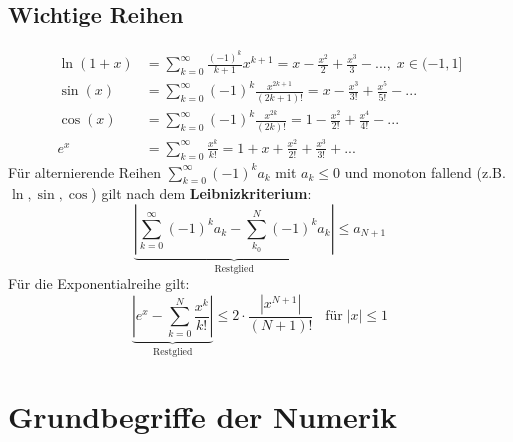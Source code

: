 \documentclass[a4paper,twocolumn,10pt]{article}
\begin{document}
\subsection{Wichtige Reihen}
\begin{equation*}
\begin{split}
\ln(1+x)&=\sum\limits_{k=0}^{\infty}\frac{(-1)^k}{k+1}x^{k+1}=x-\frac{x^2}{2}+\frac{x^3}{3}-...,\;x\in (-1,1]\\
\sin(x)&=\sum\limits_{k=0}^{\infty}(-1)^k\frac{x^{2k+1}}{(2k+1)!}=x-\frac{x^3}{3!}+\frac{x^5}{5!}-...\\
\cos(x)&=\sum\limits_{k=0}^{\infty}(-1)^k\frac{x^{2k}}{(2k)!}=1-\frac{x^2}{2!}+\frac{x^4}{4!}-...\\
e^x&=\sum_{k=0}^{\infty}\frac{x^k}{k!}=1+x+\frac{x^2}{2!}+\frac{x^3}{3!}+...
\end{split}
\end{equation*}
Für alternierende Reihen $\sum_{k=0}^{\infty}(-1)^ka_k$ mit $a_k\leq 0$ und monoton fallend (z.B. $\ln,\sin,\cos$) gilt nach dem \textbf{Leibnizkriterium}:
\begin{equation*}
\underbrace{\left|\sum_{k=0}^{\infty}(-1)^ka_k-\sum_{k_0}^{N}(-1)^ka_k\right|}_{\text{Restglied}}\leq a_{N+1}
\end{equation*}
Für die Exponentialreihe gilt:
\begin{equation*}
\underbrace{\left|e^x-\sum_{k=0}^{N}\frac{x^k}{k!}\right|}_{\text{Restglied}}\leq 2\cdot\frac{|x^{N+1}|}{(N+1)!}\;\;\;\text{für}\; |x|\leq 1
\end{equation*}

\section{Grundbegriffe der Numerik}
\end{document}
